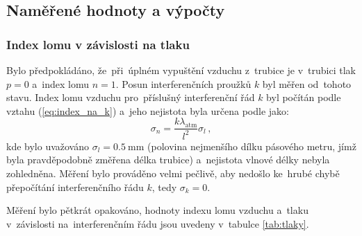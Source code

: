 \documentclass{../concepts/titul_zprava_p/prepareprotokolZprava} %
\begin{document}
\subsection{Naměřené hodnoty a výpočty}

\subsubsection{Index lomu v závislosti na tlaku}

Bylo předpokládáno, že~při~úplném vypuštění vzduchu z~trubice je v~trubici tlak $p=0$ a~index lomu $n=1$. Posun interferenčních
proužků $k$ byl měřen od~tohoto stavu. Index lomu vzduchu pro~příslušný interferenční řád $k$ byl počítán podle vztahu
(\ref{eq:index_na_k}) a~jeho nejistota byla určena podle \cite{englich} jako:
\begin{equation}
    \label{eq:sigma_n_na_k}
    \sigma_n = \frac{k \lambda_{\mathrm{atm}}}{l^2} \sigma_l \,,
\end{equation}
kde bylo uvažováno $\sigma_l=\qty{0.5}{\milli\meter}$ (polovina nejmenšího dílku pásového metru, jímž byla pravděpodobně 
změřena délka trubice) a~nejistota vlnové délky nebyla zohledněna. Měření bylo prováděno velmi pečlivě, aby nedošlo ke~hrubé 
chybě přepočítání interferenčního řádu $k$, tedy $\sigma_k=0$.

Měření bylo pětkrát opakováno, hodnoty indexu lomu vzduchu a~tlaku v~závislosti na~interferenčním řádu jsou uvedeny
v~tabulce \ref{tab:tlaky}.
\end{document}
